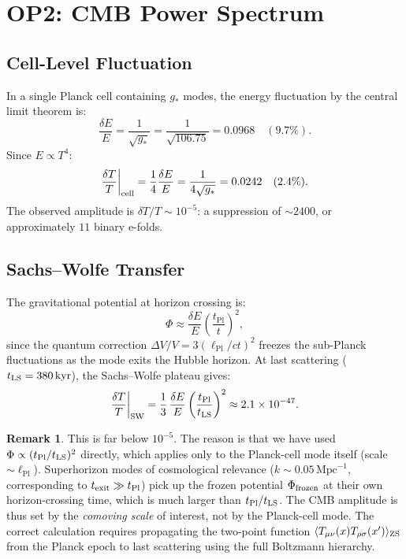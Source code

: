 \documentclass[12pt,a4paper]{article}
\theoremstyle{definition}
\newtheorem{remark}[theorem]{Remark}
\newcommand{\tPl}{t_{\mathrm{Pl}}}
\newcommand{\lPl}{\ell_{\mathrm{Pl}}}
\newcommand{\gstar}{g_{*}}
\begin{document}
\section{OP2: CMB Power Spectrum}
\label{sec:op2}

\subsection{Cell-Level Fluctuation}

In a single Planck cell containing $\gstar$ modes, the energy fluctuation
by the central limit theorem is:
\begin{equation}
  \frac{\delta E}{E} = \frac{1}{\sqrt{\gstar}} = \frac{1}{\sqrt{106.75}}
  = 0.0968 \quad (9.7\%).
\end{equation}
Since $E \propto T^4$:
\begin{equation}
  \frac{\delta T}{T}\bigg|_{\rm cell} = \frac{1}{4}\frac{\delta E}{E}
  = \frac{1}{4\sqrt{\gstar}} = 0.0242 \quad (2.4\%).
\end{equation}
The observed amplitude is $\delta T/T \sim 10^{-5}$: a suppression of
$\sim 2400$, or approximately $11$ binary e-folds.

\subsection{Sachs--Wolfe Transfer}

The gravitational potential at horizon crossing is:
\begin{equation}
  \Phi \approx \frac{\delta E}{E}\left(\frac{\tPl}{t}\right)^2,
\end{equation}
since the quantum correction $\Delta V/V = 3(\lPl/ct)^2$ freezes the
sub-Planck fluctuations as the mode exits the Hubble horizon.
At last scattering ($t_{\rm LS} = 380\,\mathrm{kyr}$), the Sachs--Wolfe
plateau gives:
\begin{equation}
  \frac{\delta T}{T}\bigg|_{\rm SW}
  = \frac{1}{3}\,\frac{\delta E}{E}\left(\frac{\tPl}{t_{\rm LS}}\right)^2
  \approx 2.1\times10^{-47}.
\end{equation}

\begin{remark}
This is far below $10^{-5}$. The reason is that we have used
$\Phi \propto (t_{\rm Pl}/t_{\rm LS})^2$ directly, which applies only to
the Planck-cell mode itself (scale $\sim\lPl$). Superhorizon modes of
cosmological relevance ($k \sim 0.05\,\mathrm{Mpc}^{-1}$, corresponding to
$t_{\rm exit} \gg t_{\rm Pl}$) pick up the frozen potential
$\Phi_{\rm frozen}$ at their own horizon-crossing time, which is much larger
than $\tPl/t_{\rm LS}$. The CMB amplitude is thus set by the
\emph{comoving scale} of interest, not by the Planck-cell mode.
The correct calculation requires propagating the two-point function
$\langle T_{\mu\nu}(x)T_{\rho\sigma}(x')\rangle_{\rm ZS}$ from the
Planck epoch to last scattering using the full Boltzmann hierarchy.
\end{remark}
\end{document}
